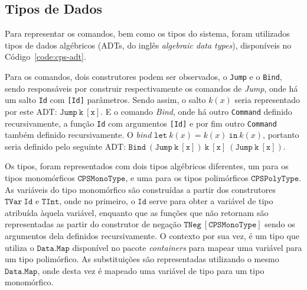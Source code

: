 \subsection{Tipos de Dados}\label{subsec:cps-adt}

Para representar os comandos, bem como os tipos do sistema, foram utilizados tipos de dados algébricos (ADTs, do inglês \textit{algebraic data types}), disponíveis no Código~\ref{code:cps-adt}.


Para os comandos, dois construtores podem ser observados, o \texttt{Jump} e o \texttt{Bind}, sendo responsáveis por construir respectivamente os comandos de \textit{Jump}, onde há um salto \texttt{Id} com \texttt{[Id]} parâmetros.
Sendo assim, o salto $k(x)$ seria representado por este ADT: $\mathtt{Jump\ k\ [x]}$.
E o comando \textit{Bind}, onde há outro \texttt{Command} definido recursivamente, a função \texttt{Id} com argumentos \texttt{[Id]} e por fim outro \texttt{Command} também definido recursivamente.
O \textit{bind} $\mathtt{let}\ k(x) = k(x)\ \mathtt{in}\ k(x)$, portanto seria definido pelo seguinte ADT: $\mathtt{Bind\ (Jump\ k\ [x])\ k\ [x]\ (Jump\ k\ [x])}$.

Os tipos, foram representados com dois tipos algébricos diferentes, um para os tipos monomórficos $\mathtt{CPSMonoType}$, e uma para os tipos polimórficos $\mathtt{CPSPolyType}$.
As variáveis do tipo monomórfico são construídas a partir dos construtores $\mathtt{TVar\ Id}$ e $\mathtt{TInt}$, onde no primeiro, o $\mathtt{Id}$ serve para obter a variável de tipo atribuída àquela variável, enquanto que as funções que não retornam são representadas as partir do construtor de negação $\mathtt{TNeg\ [CPSMonoType]}$ sendo os argumentos dela definidos recursivamente.
O contexto por sua vez, é um tipo que utiliza o $\mathtt{Data.Map}$ disponível no pacote \textit{containers} para mapear uma variável para um tipo polimórfico.
As substituições são representadas utilizando o mesmo $\mathtt{Data.Map}$, onde desta vez é mapeado uma variável de tipo para um tipo monomórfico.
